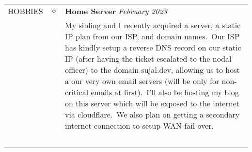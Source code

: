 \documentclass[11pt]{article}
\begin{document}
\begin{tabularx}{\textwidth}{@{}b{90px} b{9px}@{} X@{}}
        \lettrine[lines=1,loversize=-0.5]{H}OBBIES & $\diamond$ &

        \textbf{Home Server} \hfill \textit{February 2023} \\ & &
        My sibling and I recently acquired a server, a static IP plan from our ISP, and domain names.\ Our ISP has
        kindly setup a reverse DNS record on our static IP (after having the ticket escalated to the nodal officer) to
        the domain sujal.dev, allowing us to host a our very own email servers (will be only for non-critical emails
        at first).\ I'll also be hosting my blog on this server which will be exposed to the internet via cloudflare.\
        We also plan on getting a secondary internet connection to setup WAN fail-over.

        \iftoggle{lines}{\\ \\ \hline \\}{\\ \\}

    \end{tabularx}
\end{document}
